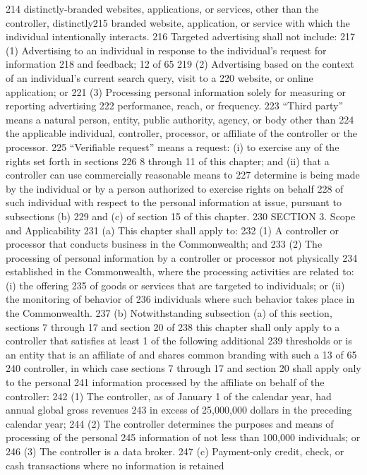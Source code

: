 214 distinctly-branded websites, applications, or services, other than the controller, distinctly215 branded website, application, or service with which the individual intentionally interacts.
216 Targeted advertising shall not include:
217 (1) Advertising to an individual in response to the individual’s request for information
218 and feedback;
12 of 65
219 (2) Advertising based on the context of an individual’s current search query, visit to a
220 website, or online application; or
221 (3) Processing personal information solely for measuring or reporting advertising
222 performance, reach, or frequency.
223 “Third party” means a natural person, entity, public authority, agency, or body other than
224 the applicable individual, controller, processor, or affiliate of the controller or the processor.
225 “Verifiable request” means a request: (i) to exercise any of the rights set forth in sections
226 8 through 11 of this chapter; and (ii) that a controller can use commercially reasonable means to
227 determine is being made by the individual or by a person authorized to exercise rights on behalf
228 of such individual with respect to the personal information at issue, pursuant to subsections (b)
229 and (c) of section 15 of this chapter.
230 SECTION 3. Scope and Applicability
231 (a) This chapter shall apply to:
232 (1) A controller or processor that conducts business in the Commonwealth; and
233 (2) The processing of personal information by a controller or processor not physically
234 established in the Commonwealth, where the processing activities are related to: (i) the offering
235 of goods or services that are targeted to individuals; or (ii) the monitoring of behavior of
236 individuals where such behavior takes place in the Commonwealth.
237 (b) Notwithstanding subsection (a) of this section, sections 7 through 17 and section 20 of
238 this chapter shall only apply to a controller that satisfies at least 1 of the following additional
239 thresholds or is an entity that is an affiliate of and shares common branding with such a
13 of 65
240 controller, in which case sections 7 through 17 and section 20 shall apply only to the personal
241 information processed by the affiliate on behalf of the controller:
242 (1) The controller, as of January 1 of the calendar year, had annual global gross revenues
243 in excess of 25,000,000 dollars in the preceding calendar year;
244 (2) The controller determines the purposes and means of processing of the personal
245 information of not less than 100,000 individuals; or
246 (3) The controller is a data broker.
247 (c) Payment-only credit, check, or cash transactions where no information is retained
